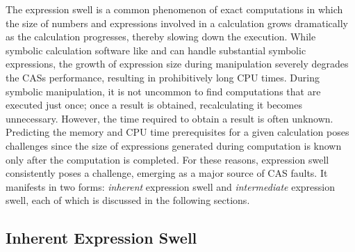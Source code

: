 The expression swell is a common phenomenon of exact computations in which the size of numbers and expressions involved in a calculation grows dramatically as the calculation progresses, thereby slowing down the execution. While symbolic calculation software like \Maple{} and \Mathematica{} can handle substantial symbolic expressions, the growth of expression size during manipulation severely degrades the \acp{CAS} performance, resulting in prohibitively long \ac{CPU} times. During symbolic manipulation, it is not uncommon to find computations that are executed just once; once a result is obtained, recalculating it becomes unnecessary. However, the time required to obtain a result is often unknown. Predicting the memory and \ac{CPU} time prerequisites for a given calculation poses challenges since the size of expressions generated during computation is known only after the computation is completed. For these reasons, expression swell consistently poses a challenge, emerging as a major source of \ac{CAS} faults. It manifests in two forms: \emph{inherent} expression swell and \emph{intermediate} expression swell, each of which is discussed in the following sections.

\subsection{Inherent Expression Swell}

